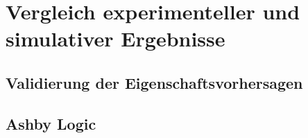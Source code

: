 \chapter{Vergleich experimenteller und simulativer Ergebnisse}
\section{Validierung der Eigenschaftsvorhersagen}

\section{Ashby Logic}
